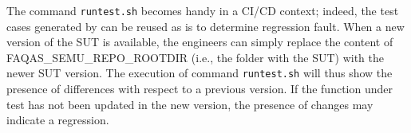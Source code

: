 The command \texttt{runtest.sh} becomes handy in a CI/CD context; indeed, the test cases generated by \SEMUS can be reused as is to determine regression fault. When a new version of the SUT is available, the engineers can simply replace the content of FAQAS\_SEMU\_REPO\_ROOTDIR (i.e., the folder with the SUT) with the newer SUT version. The execution of command \texttt{runtest.sh} will thus show the presence of differences with respect to a previous version. If the function under test has not been updated in the new version, the presence of changes may indicate a regression.